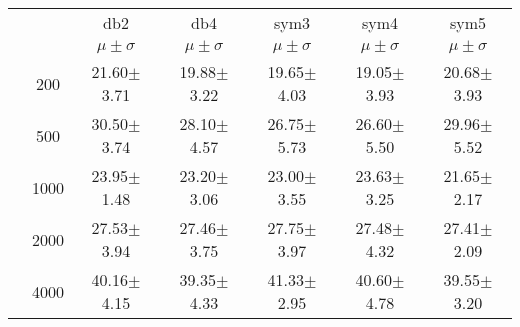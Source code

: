 \begin{table}[H]
\begin{tabular}{|c|c|c c c c c|}
\multicolumn{2}{c|}{}  & db2 & db4 & sym3 & sym4 & sym5 \\\cline{3-7}
\multicolumn{2}{c|}{}& $\mu \pm \sigma$ & $\mu \pm \sigma$ & $\mu \pm \sigma$ & $\mu \pm \sigma$ & $\mu \pm \sigma$ \\\hline

\multicolumn{1}{|c|}{ \multirow{5}{*}{\rotatebox[origin=c]{90}{\textbf{Neurônios}}} }
&200	&21.60$\pm$3.71	&19.88$\pm$3.22	&19.65$\pm$4.03	&19.05$\pm$3.93	&20.68$\pm$3.93\\\cline{2-7}
&500	&30.50$\pm$3.74	&28.10$\pm$4.57	&26.75$\pm$5.73	&26.60$\pm$5.50	&29.96$\pm$5.52\\\cline{2-7}
&1000	&23.95$\pm$1.48	&23.20$\pm$3.06	&23.00$\pm$3.55	&23.63$\pm$3.25	&21.65$\pm$2.17\\\cline{2-7}
&2000	&27.53$\pm$3.94	&27.46$\pm$3.75	&27.75$\pm$3.97	&27.48$\pm$4.32	&27.41$\pm$2.09\\\cline{2-7}
&4000	&40.16$\pm$4.15	&39.35$\pm$4.33	&41.33$\pm$2.95	&40.60$\pm$4.78	&39.55$\pm$3.20\\\midrule
	\end{tabular}

\end{table} %

